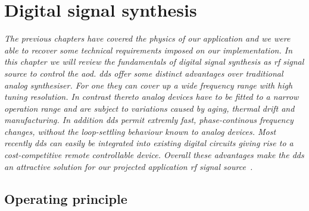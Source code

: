 \chapter{Digital signal synthesis}\label{ch:digital_signal_synthesis}

\textit{The previous chapters have covered the physics of our application and
we were able to recover some technical requirements imposed on our
implementation. In this chapter we will review the fundamentals of digital
signal synthesis as \gls{rf} signal source to control the \gls{aod}.
\gls{dds} offer some distinct advantages over traditional analog
synthesiser. For one they can cover up a wide frequency range with high
tuning resolution. In contrast thereto analog devices have to be fitted to
a narrow operation range and are subject to variations caused by aging,
thermal drift and manufacturing. In addition \gls{dds} permit extremly fast,
phase-continous frequency changes, without the loop-settling behaviour
known to analog devices. Most recently \gls{dds} can easily be integrated
into existing digital circuits giving rise to a cost-competitive remote
controllable device. Overall these advantages make the \gls{dds} an
attractive solution for our projected application \gls{rf} signal
source~\cite{ADTutDDS}.}

\section{Operating principle}

